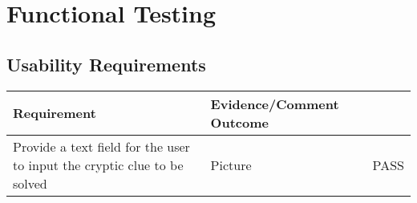 \section{Functional Testing}
\label{sec:functional_testing}

\subsection{Usability Requirements}
\label{sub:test_func_usability}

\begin{longtable}{|L{14cm}|C{2cm}|}
  \hline
  {\bfseries Requirement} & {\bfseries Evidence/Comment} {\bfseries Outcome}   \\
  \hline

  Provide a text field for the user to input the cryptic clue
to be solved            & Picture                             & PASS \\  \hline


\end{longtable}